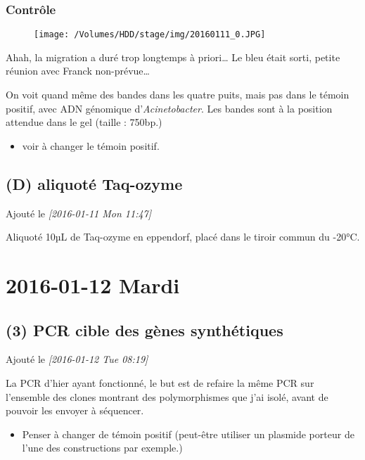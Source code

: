 \documentclass[9pt, oneside, twocolumn]{scrartcl}
\begin{document}
\subsubsection{Contrôle}
\label{sec:orgheadline3}
\begin{figure}[htb]
\centering
\texttt{[image: /Volumes/HDD/stage/img/20160111\_0.JPG]}
\end{figure}

Ahah, la migration a duré trop longtemps à priori… Le bleu était sorti, petite
réunion avec Franck non-prévue…

On voit quand même des bandes dans les quatre puits, mais pas dans le témoin
positif, avec ADN génomique d'\emph{Acinetobacter}. Les bandes sont à la position
attendue dans le gel (taille : 750bp.) 

\begin{itemize}
\item voir à changer le témoin positif.
\end{itemize}

\subsection{(D) aliquoté Taq-ozyme}
\label{sec:orgheadline5}
Ajouté le \textit{[2016-01-11 Mon 11:47]}

Aliquoté 10µL de Taq-ozyme en eppendorf, placé dans le tiroir commun du -20°C.

\section{2016-01-12 Mardi}
\label{sec:orgheadline18}
\subsection{(3) PCR cible des gènes synthétiques}
\label{sec:orgheadline10}
Ajouté le \textit{[2016-01-12 Tue 08:19]}

La PCR d'hier ayant fonctionné, le but est de refaire la même PCR sur l'ensemble
des clones montrant des polymorphismes que j'ai isolé, avant de pouvoir les
envoyer à séquencer.

\begin{itemize}
\item Penser à changer de témoin positif (peut-être utiliser un plasmide porteur de
l'une des constructions par exemple.)
\end{itemize}
\end{document}
